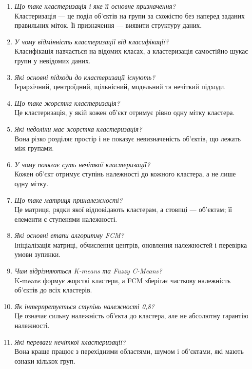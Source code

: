 \documentclass[12pt,a4paper]{article}
\begin{document}
\begin{enumerate}[leftmargin=*]
\item \textit{Що таке кластеризація і яке її основне призначення?}\\
Кластеризація --- це поділ об'єктів на групи за схожістю без наперед заданих правильних міток. Її призначення --- виявити структуру даних.
\item \textit{У чому відмінність кластеризації від класифікації?}\\
Класифікація навчається на відомих класах, а кластеризація самостійно шукає групи у невідомих даних.
\item \textit{Які основні підходи до кластеризації існують?}\\
Ієрархічний, центроїдний, щільнісний, модельний та нечіткий підходи.
\item \textit{Що таке жорстка кластеризація?}\\
Це кластеризація, у якій кожен об'єкт отримує рівно одну мітку кластера.
\item \textit{Які недоліки має жорстка кластеризація?}\\
Вона різко розділяє простір і не показує невизначеність об'єктів, що лежать між групами.
\item \textit{У чому полягає суть нечіткої кластеризації?}\\
Кожен об'єкт отримує ступінь належності до кожного кластера, а не лише одну мітку.
\item \textit{Що таке матриця приналежності?}\\
Це матриця, рядки якої відповідають кластерам, а стовпці --- об'єктам; її елементи є ступенями належності.
\item \textit{Які основні етапи алгоритму FCM?}\\
Ініціалізація матриці, обчислення центрів, оновлення належностей і перевірка умови зупинки.
\item \textit{Чим відрізняються K-means та Fuzzy C-Means?}\\
K-means формує жорсткі кластери, а FCM зберігає часткову належність об'єктів до всіх кластерів.
\item \textit{Як інтерпретується ступінь належності 0,8?}\\
Це означає сильну належність об'єкта до кластера, але не абсолютну гарантію належності.
\item \textit{Які переваги нечіткої кластеризації?}\\
Вона краще працює з перехідними областями, шумом і об'єктами, які мають ознаки кількох груп.

\end{enumerate}
\end{document}
